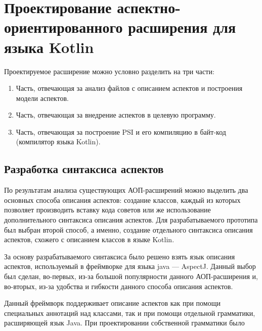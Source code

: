 \chapter{Проектирование аспектно-ориентированного расширения для языка Kotlin}
\label{ch:extension_design}
Проектируемое расширение можно условно разделить на три части:
\begin{enumerate}
	\item Часть, отвечающая за анализ файлов с описанием аспектов и построения
		модели аспектов.
	\item Часть, отвечающая за внедрение аспектов в целевую программу.
	\item Часть, отвечающая за построение PSI и его компиляцию в байт-код (компилятор языка Kotlin).
\end{enumerate}
\section{Разработка синтаксиса аспектов}
\label{sec:aspect_syntax_design}
По результатам анализа существующих АОП-расширений можно выделить два основных
способа описания аспектов: создание классов, каждый из которых позволяет
производить вставку кода советов или же использование дополнительного синтаксиса
описания аспектов.
Для разрабатываемого прототипа был выбран второй способ, а именно, создание
отдельного синтаксиса описания аспектов, схожего с описанием классов в языке
Kotlin.

За основу разрабатываемого синтаксиса было решено взять язык описания аспектов,
используемый в фреймворке для языка java --- AspectJ.
Данный выбор был сделан, во-первых, из-за большой популярности данного
АОП-расширения и, во-вторых, из-за удобства и гибкости данного способа описания
аспектов.

Данный фреймворк поддерживает описание аспектов как при помощи специальных аннотаций над классами, так и при помощи отдельной грамматики, расширяющей язык Java.
При проектировании собственной грамматики было 
